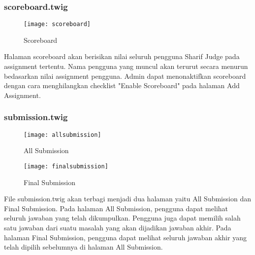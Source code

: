 \subsubsection{scoreboard.twig}
\begin{figure}[H]
	\centering  
	\texttt{[image: scoreboard]}  
	\caption[Scoreboard]{Scoreboard} 
	\label{fig:scoreboard} 
\end{figure} 
Halaman scoreboard akan berisikan nilai seluruh pengguna Sharif Judge pada assignment tertentu. Nama pengguna yang muncul akan terurut secara menurun bedasarkan nilai assignment pengguna. Admin dapat menonaktifkan scoreboard dengan cara menghilangkan checklist "Enable Scoreboard" pada halaman Add Assignment.

\subsubsection{submission.twig}
\begin{figure}[H]
	\centering  
	\texttt{[image: allsubmission]}  
	\caption[All Submission]{All Submission} 
	\label{fig:allsubmission} 
\end{figure} 

\begin{figure}[H]
	\centering  
	\texttt{[image: finalsubmission]}  
	\caption[Final Submission]{Final Submission} 
	\label{fig:finalsubmission} 
\end{figure} 

File submission.twig akan terbagi menjadi dua halaman yaitu All Submission dan Final Submission. Pada halaman All Submission, pengguna dapat melihat seluruh jawaban yang telah dikumpulkan. Pengguna juga dapat memilih salah satu jawaban dari suatu masalah yang akan dijadikan jawaban akhir. Pada halaman Final Submission, pengguna dapat melihat seluruh jawaban akhir yang telah dipilih sebelumnya di halaman All Submission.